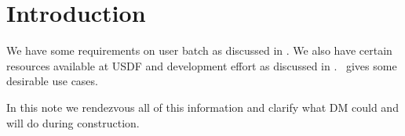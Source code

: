 \section{Introduction} \label{sec:intro}

We have some requirements on user batch as discussed in .
We also have certain resources available at USDF  and development effort as discussed in .\
 gives some desirable use cases.

In this note we rendezvous all of this information and clarify what DM could and will do during construction.
